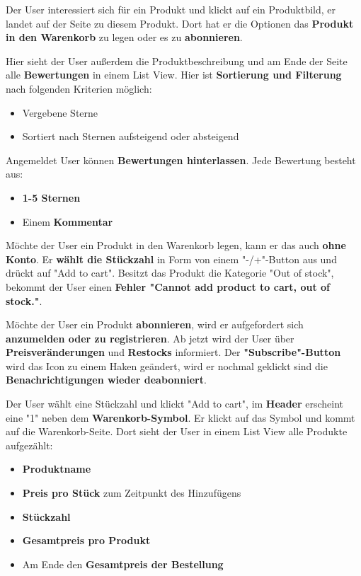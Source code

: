 \documentclass[12pt, a4paper]{scrreprt}
\begin{document}
		Der User interessiert sich für ein Produkt und klickt auf ein Produktbild, er landet auf der Seite zu diesem Produkt. Dort hat er die Optionen das \textbf{Produkt in den Warenkorb} zu legen oder es zu \textbf{abonnieren}. 
		
		Hier sieht der User außerdem die Produktbeschreibung und am Ende der Seite alle \textbf{Bewertungen} in einem List View. Hier ist \textbf{Sortierung und Filterung} nach folgenden Kriterien möglich:
		\begin{itemize}
			\item Vergebene Sterne
			\item Sortiert nach Sternen aufsteigend oder absteigend
		\end{itemize}
		Angemeldet User können \textbf{Bewertungen hinterlassen}. Jede Bewertung besteht aus:
		\begin{itemize}
			\item \textbf{1-5 Sternen}
			\item Einem \textbf{Kommentar}
		\end{itemize}
		
		Möchte der User ein Produkt in den Warenkorb legen, kann er das auch \textbf{ohne Konto}. Er \textbf{wählt die Stückzahl} in Form von einem "-/+"-Button aus und drückt auf "Add to cart". Besitzt das Produkt die Kategorie "Out of stock", bekommt der User einen \textbf{Fehler "Cannot add product to cart, out of stock."}.
		
		Möchte der User ein Produkt \textbf{abonnieren}, wird er aufgefordert sich \textbf{anzumelden oder zu registrieren}. Ab jetzt wird der User über \textbf{Preisveränderungen} und \textbf{Restocks} informiert. Der \textbf{"Subscribe"-Button} wird das Icon zu einem Haken geändert, wird er nochmal geklickt sind die \textbf{Benachrichtigungen wieder deabonniert}.
		
		Der User wählt eine Stückzahl und klickt "Add to cart", im \textbf{Header} erscheint eine "1" neben dem \textbf{Warenkorb-Symbol}. Er klickt auf das Symbol und kommt auf die Warenkorb-Seite. Dort sieht der User in einem List View alle Produkte aufgezählt:
		\begin{itemize}
			\item \textbf{Produktname}
			\item \textbf{Preis pro Stück} zum Zeitpunkt des Hinzufügens
			\item \textbf{Stückzahl}
			\item \textbf{Gesamtpreis pro Produkt}
			\item Am Ende den \textbf{Gesamtpreis der Bestellung}
		\end{itemize}
		
\end{document}
